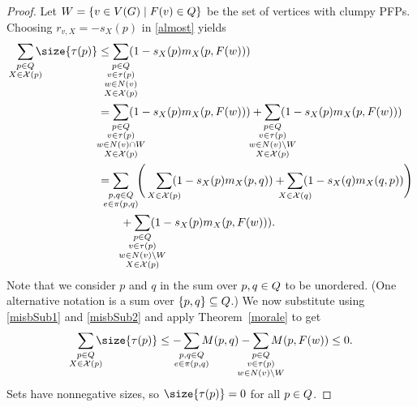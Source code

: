 \begin{proof}
Let $W = \set{v \in \V}{\pfp{v} \in \cpfps}$ be the set of vertices with clumpy
PFPs. Choosing $r_{v,X} = -s_X(p)$ in \eqref{almost} yields
\begin{align*}
  \smashoperator[r]{\sum_{\substack{
        p \in \cpfps \\
        X \in \sctr{p}
      }}}\size{\pfpverts{p}}
  &\leq
  \smashoperator{\sum_{\substack{
        p \in \cpfps \\ v \in \pfpverts{p} \\
        w \in \N{v} \\ X \in \sctr{p}
      }}}(1-s_X(p)\misb{X}{p}{\pfp{w}}) \\
  &=
  \smashoperator{\sum_{\substack{
        p \in \cpfps \\ v \in \pfpverts{p} \\
        w \in \N{v} \cap W \\ X \in \sctr{p}
      }}}(1-s_X(p)\misb{X}{p}{\pfp{w}}) +
  \smashoperator{\sum_{\substack{
        p \in \cpfps \\ v \in \pfpverts{p} \\
        w \in \N{v} \setminus W \\ X \in \sctr{p}
      }}}(1-s_X(p)\misb{X}{p}{\pfp{w}}) \\
  &=
  \smashoperator[l]{\sum_{\substack{
        p,q \in \cpfps \\
        e \in \pfpedges{p}{q}
      }}}\!\!
  \Bigg(\smashoperator[r]{\sum_{X \in \sctr{p}}}(1-s_X(p)\misb{X}{p}{q})
  + \smashoperator{\sum_{X \in \sctr{q}}}(1-s_X(q)\misb{X}{q}{p})\Bigg)
  \\ &\qquad +
  \smashoperator{\sum_{\substack{
        p \in \cpfps \\ v \in \pfpverts{p} \\
        w \in \N{v} \setminus W \\ X \in \sctr{p}
      }}}(1-s_X(p)\misb{X}{p}{\pfp{w}}). \\
\end{align*}
Note that we consider $p$ and $q$ in the sum over $p,q \in \cpfps$ to be
unordered. (One alternative notation is a sum over $\{p,q\} \subseteq \cpfps$.)
We now substitute using \eqref{misbSub1} and \eqref{misbSub2} and apply
Theorem~\ref{morale} to get
\[
  \smashoperator[r]{\sum_{\substack{
        p \in \cpfps \\
        X \in \sctr{p}
      }}}\size{\pfpverts{p}}
  \leq
  -\smashoperator{\sum_{\substack{
        p,q \in \cpfps \\
        e \in \pfpedges{p}{q}
      }}}M(p,q) -
  \smashoperator{\sum_{\substack{
        p \in \cpfps \\
        v \in \pfpverts{p} \\ w \in \N{v} \setminus W
      }}}M(p,F(w))
  \leq 0.
\]
Sets have nonnegative sizes, so $\size{\pfpverts{p}} = 0$ for all $p \in
\cpfps$.
\end{proof}
